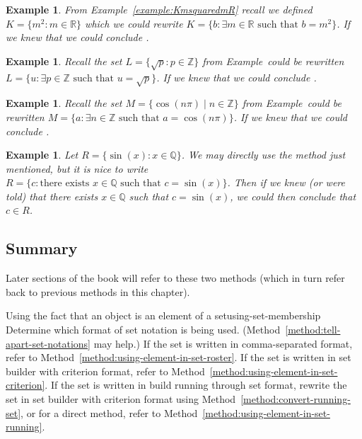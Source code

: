 \documentclass{book}
\newcounter{ekcounter}%
\theoremstyle{ekimcustom}
\newtheorem{example}[ekcounter]{Example}
\begin{document}
\begin{example}
From Example~\ref{example:KmsquaredmR} recall we defined $K = \{ m^2 : m \in \mathbb{R}\}$
which we could rewrite $K = \{ b : \exists m \in \mathbb{R} \text{ such that } b = m^2\}$.
If we knew that  we could conclude .
\end{example}
\begin{example}
Recall the set $L = \{ \sqrt{p} : p \in \mathbb{Z}\}$ from Example~\label{example:Lsqrtp-with-pinZ}
could be rewritten $L = \{u : \exists p \in \mathbb{Z} \text{ such that } u = \sqrt{p}\}$.
If we knew that  we could conclude .
\end{example}
\begin{example}
Recall the set $M = \{ \cos(n\pi) \mid n \in \mathbb{Z}\}$ from Example~\label{example:Mcosnpi}
could be rewritten $M = \{ a : \exists n \in \mathbb{Z} \text{ such that } a = \cos(n\pi)\}$.
If we knew that  we could conclude .
\end{example}



\begin{example}\label{example:range-preview}
Let $R = \{ \sin(x) : x \in \mathbb{Q}\}$. We may directly use the method just mentioned, but it is nice to write $R = \{ c : \text{there exists } x \in \mathbb{Q} \text{ such that } c=\sin(x)\}$. Then if we knew (or were told) that there exists $x \in \mathbb{Q}$ such that $c=\sin(x)$, we could then conclude that $c \in R$.
\end{example}

\subsection{Summary}

Later sections of the book will refer to these two methods (which in turn refer back to previous methods in this chapter).

\begin{bmethod}{Using the fact that an object is an element of a set}{using-set-membership}
Determine which format of set notation is being used. (Method~\ref{method:tell-apart-set-notations} may help.)
If the set is written in comma-separated format, refer to Method~\ref{method:using-element-in-set-roster}.
If the set is written in set builder with criterion format, refer to Method~\ref{method:using-element-in-set-criterion}.
If the set is written in build running through set format, rewrite the set in set builder with criterion format using Method~\ref{method:convert-running-set}, or for a direct method, refer to Method~\ref{method:using-element-in-set-running}.
\end{bmethod}
\end{document}

